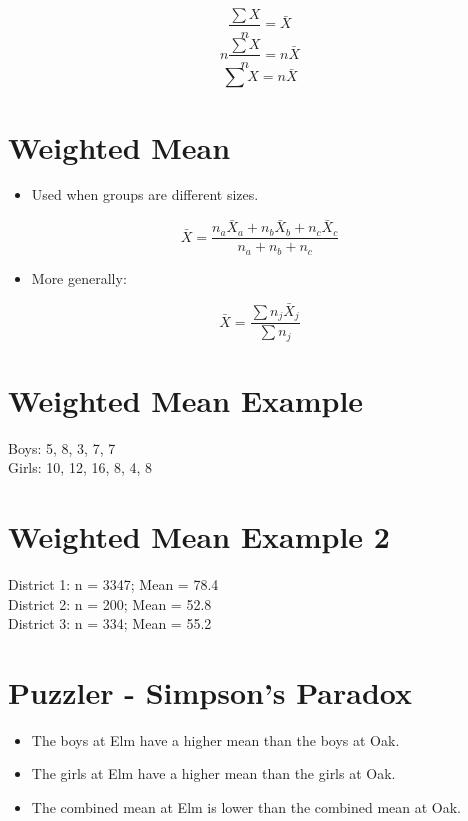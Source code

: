 \documentclass[12pt]{article}
\begin{document}
\[\frac{\sum X}{n} = \bar{X}\] \[n \frac{\sum X}{n} = n \bar{X}\]
\[\sum X = n \bar{X}\]

\section{Weighted Mean}\label{weighted-mean}

\begin{itemize}
\itemsep1pt\parskip0pt
\item
  Used when groups are different sizes.
\end{itemize}

\[ \bar{X} = \frac{n_{a}\bar{X}_{a} + n_{b}\bar{X}_{b} + n_{c}\bar{X}_{c}}{n_{a} + n_{b} + n_{c}} \]

\begin{itemize}
\itemsep1pt\parskip0pt
\item
  More generally:
\end{itemize}

\[ \bar{X} = \frac{\sum n_{j} \bar{X}_{j}}{\sum n_{j}} \]

\section{Weighted Mean Example}\label{weighted-mean-example}

Boys: 5, 8, 3, 7, 7 \\ Girls: 10, 12, 16, 8, 4, 8

\section{Weighted Mean Example 2}\label{weighted-mean-example-2}

District 1: n = 3347; Mean = 78.4\\District 2: n = 200; Mean =
52.8\\District 3: n = 334; Mean = 55.2

\section{Puzzler - Simpson's Paradox}\label{puzzler---simpsons-paradox}

\begin{itemize}
\itemsep1pt\parskip0pt
\item
  The boys at Elm have a higher mean than the boys at Oak.
\item
  The girls at Elm have a higher mean than the girls at Oak.
\item
  The combined mean at Elm is lower than the combined mean at Oak.
\end{itemize}
\end{document}

